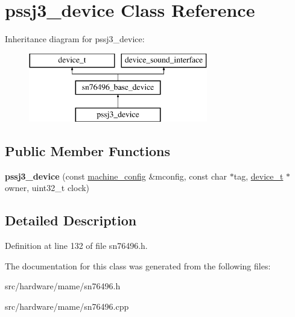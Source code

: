 \hypertarget{classpssj3__device}{\section{pssj3\-\_\-device Class Reference}
\label{classpssj3__device}
}
Inheritance diagram for pssj3\-\_\-device\-:\begin{figure}[H]
\begin{center}
\leavevmode
\includegraphics[height=3.000000cm]{classpssj3__device}
\end{center}
\end{figure}
\subsection*{Public Member Functions}
\begin{DoxyCompactItemize}
\item 
\hypertarget{classpssj3__device_a20f70489ac2610e12c81f29d75887c36}{{\bfseries pssj3\-\_\-device} (const \hyperlink{structmachine__config}{machine\-\_\-config} \&mconfig, const char $\ast$tag, \hyperlink{classdevice__t}{device\-\_\-t} $\ast$owner, uint32\-\_\-t clock)}\label{classpssj3__device_a20f70489ac2610e12c81f29d75887c36}

\end{DoxyCompactItemize}


\subsection{Detailed Description}


Definition at line 132 of file sn76496.\-h.



The documentation for this class was generated from the following files\-:\begin{DoxyCompactItemize}
\item 
src/hardware/mame/sn76496.\-h\item 
src/hardware/mame/sn76496.\-cpp\end{DoxyCompactItemize}

